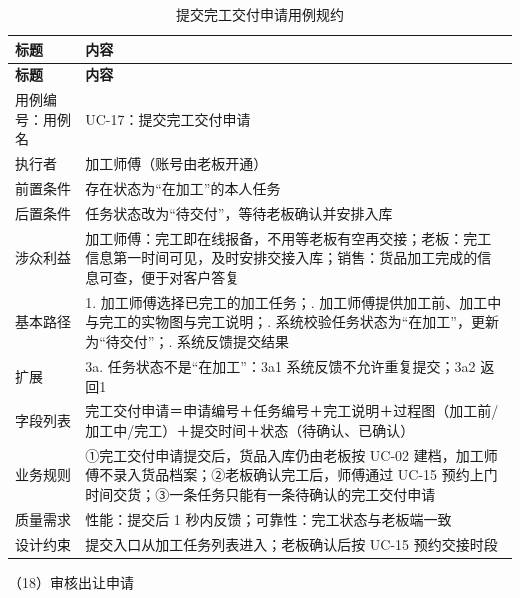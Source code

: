 {\small
\begin{longtable}{@{}L{3.0cm} L{12.3cm}@{}}
\caption{提交完工交付申请用例规约}\label{tab:uc-17}\\
\toprule
\textbf{标题} & \textbf{内容} \\
\midrule
\endfirsthead
\toprule
\textbf{标题} & \textbf{内容} \\
\midrule
\endhead
用例编号：用例名 & UC-17：提交完工交付申请 \\
\midrule
执行者 & 加工师傅（账号由老板开通） \\
\midrule
前置条件 & 存在状态为“在加工”的本人任务 \\
\midrule
后置条件 & 任务状态改为“待交付”，等待老板确认并安排入库 \\
\midrule
涉众利益 & 加工师傅：完工即在线报备，不用等老板有空再交接；\newline 老板：完工信息第一时间可见，及时安排交接入库；\newline 销售：货品加工完成的信息可查，便于对客户答复 \\
\midrule
基本路径 & 1. 加工师傅选择已完工的加工任务；. 加工师傅提供加工前、加工中与完工的实物图与完工说明；. 系统校验任务状态为“在加工”，更新为“待交付”；. 系统反馈提交结果 \\
\midrule
扩展 & 3a. 任务状态不是“在加工”：3a1 系统反馈不允许重复提交；3a2 返回1 \\
\midrule
字段列表 & 完工交付申请＝申请编号＋任务编号＋完工说明＋过程图（加工前/加工中/完工）＋提交时间＋状态（待确认、已确认） \\
\midrule
业务规则 & ①完工交付申请提交后，货品入库仍由老板按 UC-02 建档，加工师傅不录入货品档案；\newline ②老板确认完工后，师傅通过 UC-15 预约上门时间交货；\newline ③一条任务只能有一条待确认的完工交付申请 \\
\midrule
质量需求 & 性能：提交后 1 秒内反馈；\newline 可靠性：完工状态与老板端一致 \\
\midrule
设计约束 & 提交入口从加工任务列表进入；老板确认后按 UC-15 预约交接时段 \\
\midrule
\bottomrule
\end{longtable}}
\noindent（18）审核出让申请

